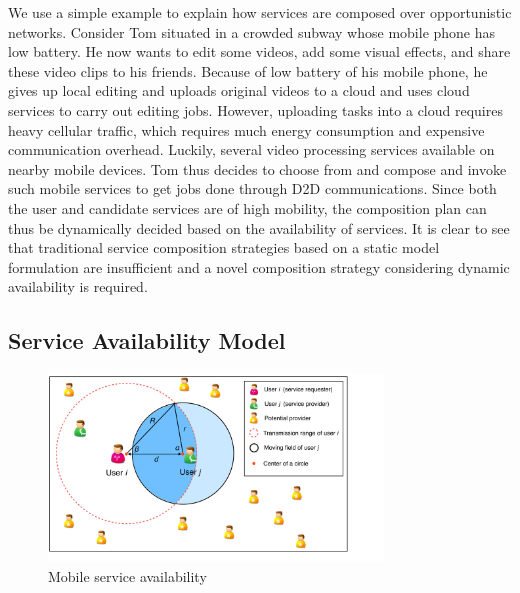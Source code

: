 \documentclass[journal]{IEEEtran}
\begin{document}
We use a simple example to explain how services are composed over opportunistic networks.
Consider Tom situated in a crowded subway whose mobile phone has low battery. 
He now wants to edit some videos, add some visual effects, and share these video clips to his friends.
Because of low battery of his mobile phone, he gives up local editing and uploads original videos to a cloud and uses cloud services to carry out editing jobs. However, uploading tasks into a cloud requires heavy cellular traffic, which requires much energy consumption and expensive communication overhead.
Luckily, several video processing services available on nearby mobile devices. Tom thus decides to choose from and compose and invoke such mobile services to get jobs done through D2D communications. 
Since both the user and candidate services are of high mobility, the composition plan can thus be dynamically decided based on the availability of services.  It is clear to see that traditional service composition strategies based on a static model formulation are insufficient and a novel composition strategy considering dynamic availability is required.

\subsection{Service Availability Model}

\begin{figure}[!t]
\centering
\includegraphics[width=3.5in]{./img/pic3.pdf}
\caption{Mobile service availability}
\label{fig_sd}
\end{figure}
\end{document}
